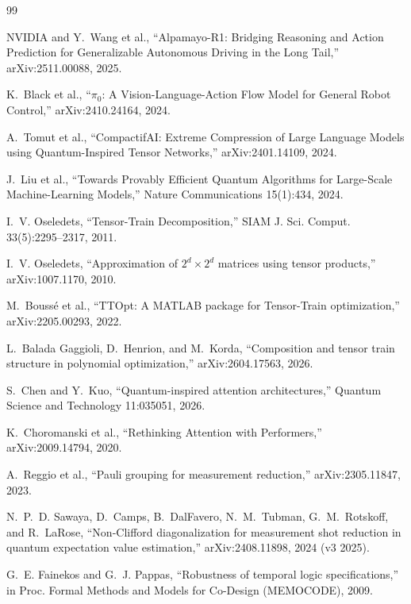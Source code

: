 \documentclass[conference,10pt]{IEEEtran}
\begin{document}
\begin{thebibliography}{99}

 NVIDIA and Y.~Wang et al., ``Alpamayo-R1: Bridging Reasoning
and Action Prediction for Generalizable Autonomous Driving in the Long Tail,''
arXiv:2511.00088, 2025.

 K.~Black et al., ``$\pi_0$: A Vision-Language-Action Flow Model
for General Robot Control,'' arXiv:2410.24164, 2024.

 A.~Tomut et al., ``CompactifAI: Extreme Compression of
Large Language Models using Quantum-Inspired Tensor Networks,''
arXiv:2401.14109, 2024.

 J.~Liu et al., ``Towards Provably Efficient Quantum Algorithms
for Large-Scale Machine-Learning Models,'' Nature Communications 15(1):434,
2024.

 I.~V. Oseledets, ``Tensor-Train Decomposition,'' SIAM J. Sci.
Comput. 33(5):2295--2317, 2011.

 I.~V. Oseledets, ``Approximation of $2^d\times2^d$ matrices using
tensor products,'' arXiv:1007.1170, 2010.

 M.~Boussé et al., ``TTOpt: A MATLAB package for Tensor-Train
optimization,'' arXiv:2205.00293, 2022.

 L.~Balada Gaggioli, D.~Henrion, and M.~Korda, ``Composition
and tensor train structure in polynomial optimization,'' arXiv:2604.17563,
2026.

 S.~Chen and Y.~Kuo, ``Quantum-inspired attention architectures,''
Quantum Science and Technology 11:035051, 2026.

 K.~Choromanski et al., ``Rethinking Attention with
Performers,'' arXiv:2009.14794, 2020.

 A.~Reggio et al., ``Pauli grouping for measurement
reduction,'' arXiv:2305.11847, 2023.

 N.~P.~D. Sawaya, D.~Camps, B.~DalFavero, N.~M.~Tubman,
G.~M.~Rotskoff, and R.~LaRose, ``Non-Clifford diagonalization for measurement
shot reduction in quantum expectation value estimation,'' arXiv:2408.11898,
2024 (v3 2025).

 G.~E. Fainekos and G.~J. Pappas, ``Robustness of temporal logic
specifications,'' in Proc. Formal Methods and Models for Co-Design (MEMOCODE),
2009.


\end{thebibliography}
\end{document}
